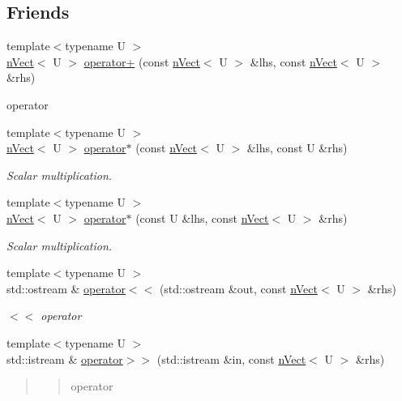 \subsection*{Friends}
\begin{DoxyCompactItemize}
\item 
{\footnotesize template$<$typename U $>$ }\\\hyperlink{classnVect}{n\+Vect}$<$ U $>$ \hyperlink{classnVect_a3ffde125079f1f4fdfc8e99d6a714439}{operator+} (const \hyperlink{classnVect}{n\+Vect}$<$ U $>$ \&lhs, const \hyperlink{classnVect}{n\+Vect}$<$ U $>$ \&rhs)
\begin{DoxyCompactList}\small\item\em 
\begin{DoxyItemize}
\item operator 
\end{DoxyItemize}\end{DoxyCompactList}\item 
{\footnotesize template$<$typename U $>$ }\\\hyperlink{classnVect}{n\+Vect}$<$ U $>$ \hyperlink{classnVect_a64c439aa3f26ec0fea5c63a6e52a1be2}{operator$\ast$} (const \hyperlink{classnVect}{n\+Vect}$<$ U $>$ \&lhs, const U \&rhs)
\begin{DoxyCompactList}\small\item\em Scalar multiplication. \end{DoxyCompactList}\item 
{\footnotesize template$<$typename U $>$ }\\\hyperlink{classnVect}{n\+Vect}$<$ U $>$ \hyperlink{classnVect_a9673bd479b1647b3f4ed8a68b1b793a9}{operator$\ast$} (const U \&lhs, const \hyperlink{classnVect}{n\+Vect}$<$ U $>$ \&rhs)
\begin{DoxyCompactList}\small\item\em Scalar multiplication. \end{DoxyCompactList}\item 
{\footnotesize template$<$typename U $>$ }\\std\+::ostream \& \hyperlink{classnVect_a6b1efa03bac435bc6ce49d8de18ad3e5}{operator$<$$<$} (std\+::ostream \&out, const \hyperlink{classnVect}{n\+Vect}$<$ U $>$ \&rhs)
\begin{DoxyCompactList}\small\item\em $<$$<$ operator \end{DoxyCompactList}\item 
{\footnotesize template$<$typename U $>$ }\\std\+::istream \& \hyperlink{classnVect_ad614110b01ea7a7d8618a95d46186916}{operator$>$$>$} (std\+::istream \&in, const \hyperlink{classnVect}{n\+Vect}$<$ U $>$ \&rhs)
\begin{DoxyCompactList}\small\item\em \begin{quote}
\begin{quote}
operator\end{quote}
\end{quote}
\end{DoxyCompactList}\end{DoxyCompactItemize}


